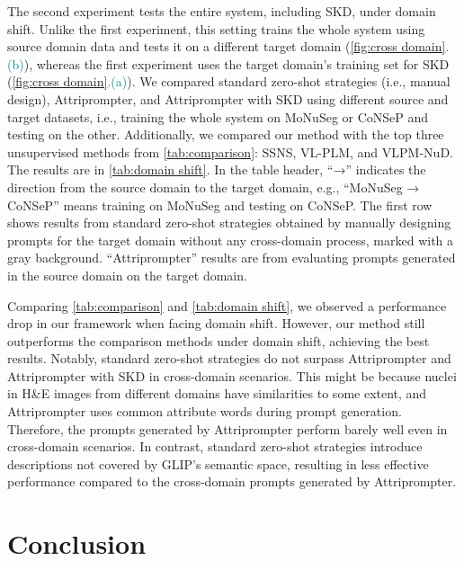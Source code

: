 \documentclass[journal,twoside,web]{ieeecolor}
\begin{document}
The second experiment tests the entire system, including SKD, under domain shift. Unlike the first experiment, this setting trains the whole system using source domain data and tests it on a different target domain (\autoref{fig:cross domain}\textcolor{darkcyan}{.\;(b)}), whereas the first experiment uses the target domain's training set for SKD (\autoref{fig:cross domain}\textcolor{darkcyan}{.\;(a)}). We compared standard zero-shot strategies (i.e., manual design), Attriprompter, and Attriprompter with SKD using different source and target datasets, i.e., training the whole system on MoNuSeg or CoNSeP and testing on the other. Additionally, we compared our method with the top three unsupervised methods from \autoref{tab:comparison}: SSNS, VL-PLM, and VLPM-NuD. The results are in \autoref{tab:domain shift}. In the table header, ``→'' indicates the direction from the source domain to the target domain, e.g., ``MoNuSeg → CoNSeP'' means training on MoNuSeg and testing on CoNSeP. The first row shows results from standard zero-shot strategies obtained by manually designing prompts for the target domain without any cross-domain process, marked with a gray background. ``Attriprompter'' results are from evaluating prompts generated in the source domain on the target domain.

Comparing \autoref{tab:comparison} and \autoref{tab:domain shift}, we observed a performance drop in our framework when facing domain shift. However, our method still outperforms the comparison methods under domain shift, achieving the best results. Notably, standard zero-shot strategies do not surpass Attriprompter and Attriprompter with SKD in cross-domain scenarios. This might be because nuclei in H\&E images from different domains have similarities to some extent, and Attriprompter uses common attribute words during prompt generation. Therefore, the prompts generated by Attriprompter perform barely well even in cross-domain scenarios. In contrast, standard zero-shot strategies introduce descriptions not covered by GLIP's semantic space, resulting in less effective performance compared to the cross-domain prompts generated by Attriprompter.

\section{Conclusion}
\end{document}
